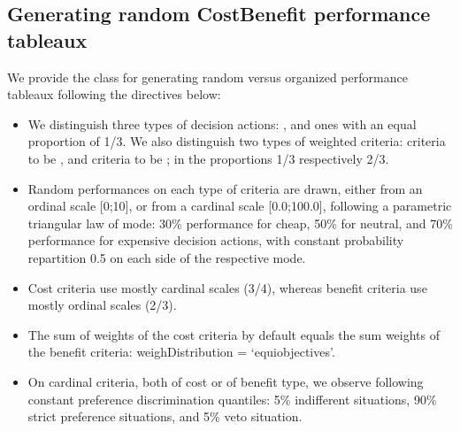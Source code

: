 \documentclass[a4paper,12pt,english]{sphinxhowto}
\begin{document}
\subsection{Generating random Cost\sphinxhyphen{}Benefit performance tableaux}
\label{\detokenize{tutorial:generating-random-cost-benefit-performance-tableaux}}\label{\detokenize{tutorial:cost-benefit-performance-tableau-label}}
We provide the  class for generating random  versus  organized performance tableaux following the directives below:
\begin{itemize}
\item {} 
We distinguish three types of decision actions: ,  and  ones with an equal proportion of 1/3. We also distinguish two types of weighted criteria:  criteria to be , and  criteria to be ; in the proportions 1/3 respectively 2/3.

\item {} 
Random performances on each type of criteria  are drawn, either from an ordinal scale {[}0;10{]}, or from a cardinal scale {[}0.0;100.0{]}, following a parametric triangular law of mode: 30\% performance for cheap, 50\% for neutral, and 70\% performance for expensive decision actions, with constant probability repartition 0.5 on each side of the respective mode.

\item {} 
Cost criteria use mostly cardinal scales (3/4), whereas benefit criteria use mostly ordinal scales (2/3).

\item {} 
The sum of weights of the cost criteria by default equals the sum weights of the benefit criteria: weighDistribution = ‘equiobjectives’.

\item {} 
On cardinal criteria, both of cost or of benefit type, we observe following constant preference discrimination quantiles: 5\% indifferent situations, 90\% strict preference situations, and 5\% veto situation.

\end{itemize}
\end{document}
